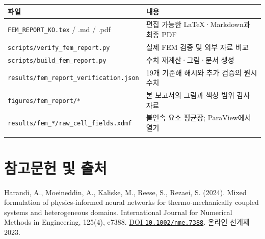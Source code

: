 \documentclass[10pt,a4paper]{article}
\begin{document}
\par\begin{minipage}{\linewidth}\begin{tabular}{>{\raggedright\arraybackslash}p{}>{\raggedright\arraybackslash}p{}}

\rowcolor{tint} \textbf{파일} & \textbf{내용}\\\midrule

\nolinkurl{FEM_REPORT_KO.tex} / .md / .pdf & 편집 가능한 LaTeX·Markdown과 최종 PDF\\\addlinespace[2pt]

\nolinkurl{scripts/verify_fem_report.py} & 실제 FEM 검증 및 외부 자료 비교\\\addlinespace[2pt]

\nolinkurl{scripts/build_fem_report.py} & 수치 재계산·그림·문서 생성\\\addlinespace[2pt]

\nolinkurl{results/fem_report_verification.json} & 19개 기준해 해시와 추가 검증의 원시 수치\\\addlinespace[2pt]

\nolinkurl{figures/fem_report/*} & 본 보고서의 그림과 색상 범위 감사 자료\\\addlinespace[2pt]

\nolinkurl{results/fem_*/raw_cell_fields.xdmf} & 불연속 요소 평균장; ParaView에서 열기\\\addlinespace[2pt]

\bottomrule\end{tabular}\end{minipage}\par\vspace{5pt}\endgroup

\clearpage

\section{참고문헌 및 출처}

{\small\color{muted} Harandi, A., Moeineddin, A., Kaliske, M., Reese, S., Rezaei, S. (2024). Mixed formulation of physics-informed neural networks for thermo-mechanically coupled systems and heterogeneous domains. International Journal for Numerical Methods in Engineering, 125(4), e7388. \href{https://doi.org/10.1002/nme.7388}{DOI \nolinkurl{10.1002/nme.7388}}. 온라인 선게재 2023.\par}
\end{document}
